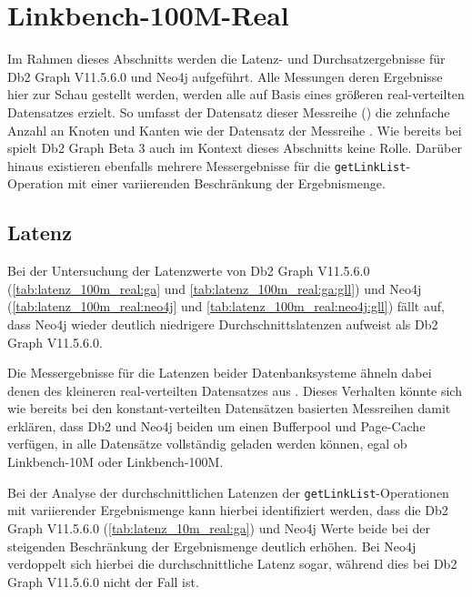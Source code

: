 \section{Linkbench-100M-Real}
\label{ergebnisse:100m_real}
Im Rahmen dieses Abschnitts werden die Latenz- und Durchsatzergebnisse für Db2 Graph V11.5.6.0 und Neo4j aufgeführt. Alle Messungen deren Ergebnisse hier zur Schau gestellt werden, werden alle auf Basis eines größeren real-verteilten Datensatzes erzielt. So umfasst der Datensatz dieser Messreihe () die zehnfache Anzahl an Knoten und Kanten wie der Datensatz der Messreihe . Wie bereits bei  spielt Db2 Graph Beta 3 auch im Kontext dieses Abschnitts keine Rolle. Darüber hinaus existieren ebenfalls mehrere Messergebnisse für die \texttt{getLinkList}-Operation mit einer variierenden Beschränkung der Ergebnismenge.

\subsection{Latenz}
Bei der Untersuchung der Latenzwerte von Db2 Graph V11.5.6.0 (\autoref{tab:latenz_100m_real:ga} und \autoref{tab:latenz_100m_real:ga:gll}) und Neo4j (\autoref{tab:latenz_100m_real:neo4j} und \autoref{tab:latenz_100m_real:neo4j:gll}) fällt auf, dass Neo4j wieder deutlich niedrigere Durchschnittslatenzen aufweist als Db2 Graph V11.5.6.0. 

Die Messergebnisse für die Latenzen beider Datenbanksysteme ähneln dabei denen des kleineren real-verteilten Datensatzes aus . Dieses Verhalten könnte sich wie bereits bei den konstant-verteilten Datensätzen basierten Messreihen damit erklären, dass Db2 und Neo4j beiden um einen Bufferpool und Page-Cache verfügen, in alle Datensätze vollständig geladen werden können, egal ob Linkbench-10M oder Linkbench-100M.

Bei der Analyse der durchschnittlichen Latenzen der \texttt{getLinkList}-Operationen mit variierender Ergebnismenge kann hierbei identifiziert werden, dass die Db2 Graph V11.5.6.0  (\autoref{tab:latenz_10m_real:ga}) und Neo4j Werte beide bei der steigenden Beschränkung der Ergebnismenge deutlich erhöhen. Bei Neo4j verdoppelt sich hierbei die durchschnittliche Latenz sogar, während dies bei Db2 Graph V11.5.6.0 nicht der Fall ist.

